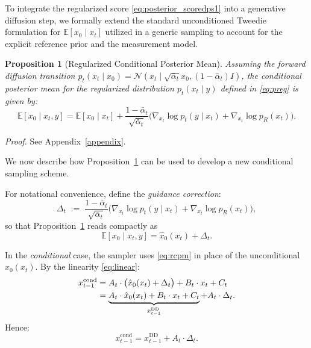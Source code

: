 \documentclass[a4paper,11pt]{article}
\theoremstyle{definition}
\theoremstyle{plain}
\newtheorem{proposition}{Proposition}
\theoremstyle{remark}
\begin{document}
To integrate the regularized score \eqref{eq:posterior_scoredps1} into a generative diffusion step, we formally extend the standard unconditioned  Tweedie formulation for $\mathbb{E}[x_0 \mid x_t] $ utilized in a generic sampling  to account for the explicit reference prior and the measurement model.

\begin{proposition}[Regularized Conditional Posterior Mean]
\label{pro:cpm}
Assuming the forward diffusion transition $p_t(x_t \mid x_0) = \mathcal{N}(x_t \mid \sqrt{\bar{\alpha}_t} x_0, (1-\bar{\alpha}_t)I)$, the conditional posterior mean for the regularized distribution $p_t(x_t \mid y)$ defined in \eqref{eq:preg} is given by:
\begin{equation}
\label{eq:Ec}	
\mathbb{E}[x_0 \mid x_t, y] = \mathbb{E}[x_0 \mid x_t] + \frac{1-\bar{\alpha}_t}{\sqrt{\bar{\alpha}_t}} \Big(\nabla_{x_t} \log p_t(y \mid x_t) + \nabla_{x_t} \log p_R(x_t)\Big).
\end{equation}	
\end{proposition}
\textit{Proof.} See Appendix~\ref{appendix}.\smallskip

We now describe how Proposition~\ref{pro:cpm} can be used to develop a new conditional sampling scheme.

For notational convenience, define the \emph{guidance correction}:
\begin{equation}
    \Delta_t
    \;:=\;
    \frac{1-\bar{\alpha}_t}{\sqrt{\bar{\alpha}_t}}
    \Big(
        \nabla_{x_t}\log p_t(y \mid x_t)
        + \nabla_{x_t}\log p_R(x_t)
    \Big),
    \label{eq:delta}
\end{equation}
so that Proposition~\ref{pro:cpm} reads compactly as
\begin{equation}
\label{eq:rcpm}
\mathbb{E}[x_0 \mid x_t, y] = \hat{x}_0(x_t) + \Delta_t.
\end{equation}

\medskip

In the \emph{conditional} case, the sampler uses \eqref{eq:rcpm}
in place of the unconditional $\hat{x}_0(x_t)$.
By the linearity \eqref{eq:linear}:
\begin{align}
    x_{t-1}^{\text{cond}}
    &= A_t \cdot \big(\hat{x}_0(x_t) + \Delta_t\big) + B_t \cdot x_t + C_t \notag\\
    &= \underbrace{A_t \cdot \hat{x}_0(x_t) + B_t \cdot x_t + C_t}_{x_{t-1}^{\mathrm{DD}}}
       + A_t \cdot \Delta_t.
    \label{eq:step1}
\end{align}
Hence:
\begin{equation}
    x_{t-1}^{\text{cond}} = x_{t-1}^{\mathrm{DD}} + A_t \cdot \Delta_t.
    \label{eq:step1b}
\end{equation}
\end{document}
